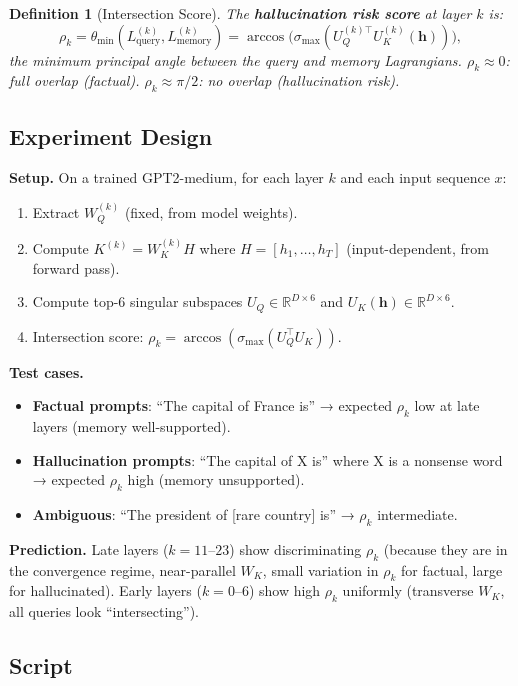\documentclass[11pt]{amsart}
\newtheorem{definition}[theorem]{Definition}
\begin{document}
\begin{definition}[Intersection Score]
The \textbf{hallucination risk score} at layer $k$ is:
\[
  \rho_k = \theta_\mathrm{min}(L_\text{query}^{(k)}, L_\text{memory}^{(k)})
  = \arccos\bigl(\sigma_\mathrm{max}(U_Q^{(k)\top} U_K^{(k)}(\mathbf{h}))\bigr),
\]
the minimum principal angle between the query and memory Lagrangians.
$\rho_k \approx 0$: full overlap (factual).
$\rho_k \approx \pi/2$: no overlap (hallucination risk).
\end{definition}

\subsection{Experiment Design}

\textbf{Setup.} On a trained GPT2-medium, for each layer $k$ and each
input sequence $x$:
\begin{enumerate}
\item Extract $W_Q^{(k)}$ (fixed, from model weights).
\item Compute $K^{(k)} = W_K^{(k)} H$ where $H = [h_1,\ldots,h_T]$
  (input-dependent, from forward pass).
\item Compute top-6 singular subspaces $U_Q \in \mathbb{R}^{D\times 6}$
  and $U_K(\mathbf{h}) \in \mathbb{R}^{D\times 6}$.
\item Intersection score: $\rho_k = \arccos(\sigma_\mathrm{max}(U_Q^\top U_K))$.
\end{enumerate}

\textbf{Test cases.}
\begin{itemize}
\item \textbf{Factual prompts}: ``The capital of France is''
  → expected $\rho_k$ low at late layers (memory well-supported).
\item \textbf{Hallucination prompts}: ``The capital of X is'' where X
  is a nonsense word → expected $\rho_k$ high (memory unsupported).
\item \textbf{Ambiguous}: ``The president of [rare country] is''
  → $\rho_k$ intermediate.
\end{itemize}

\textbf{Prediction.}
Late layers ($k=11$--$23$) show discriminating $\rho_k$
(because they are in the convergence regime, near-parallel $W_K$,
small variation in $\rho_k$ for factual, large for hallucinated).
Early layers ($k=0$--$6$) show high $\rho_k$ uniformly
(transverse $W_K$, all queries look ``intersecting'').

\subsection{Script}
\end{document}
